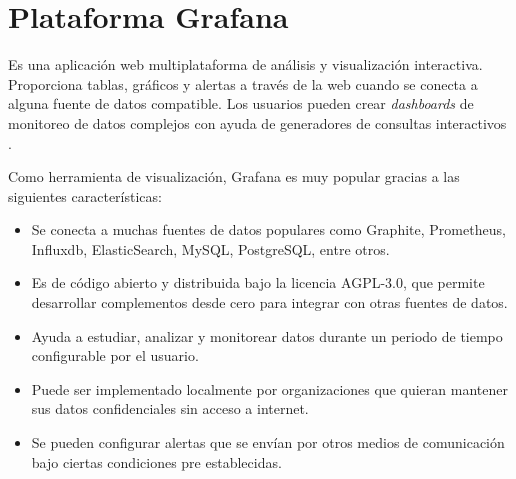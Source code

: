 \section{Plataforma Grafana}
Es una aplicación web multiplataforma de análisis y visualización interactiva. Proporciona tablas, gráficos y alertas a través de la web cuando se conecta a alguna fuente de datos compatible. Los usuarios pueden crear \textit{dashboards} de monitoreo de datos complejos con ayuda de generadores de consultas interactivos \cite{grafana_info}.

Como herramienta de visualización, Grafana es muy popular gracias a las siguientes características:
\begin{itemize}
	\item Se conecta a muchas fuentes de datos populares como Graphite, Prometheus, Influxdb, ElasticSearch, MySQL, PostgreSQL, entre otros.
	\item Es de código abierto y distribuida bajo la licencia  AGPL-3.0, que permite desarrollar complementos desde cero para integrar con otras fuentes de datos.
	\item Ayuda a estudiar, analizar y monitorear datos durante un periodo de tiempo configurable por el usuario.
	\item Puede ser implementado localmente por organizaciones que quieran mantener sus datos confidenciales sin acceso a internet.
	\item Se pueden configurar alertas que se envían por otros medios de comunicación bajo ciertas condiciones pre establecidas.
\end{itemize}




